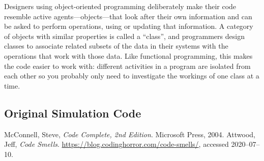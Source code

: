 \documentclass[a4paper]{article}
\begin{document}
Designers using object-oriented programming deliberately make their code resemble active agents---objects---that look after their own information and can be asked to perform operations, using or updating that information.
A category of objects with similar properties is called a ``class'', and programmers design classes to associate related subsets of the data in their systems with the operations that work with those data.
Like functional programming, this makes the code easier to work with: different activities in a program are isolated from each other so you probably only need to investigate the workings of one class at a time.

\begin{appendices}
\section{Original Simulation Code\label{code-appendix}}



\end{appendices}

\begin{thebibliography}{9}
   McConnell, Steve, \textit{Code Complete, 2nd Edition}. Microsoft Press, 2004.
   Attwood, Jeff, \textit{Code Smells}. \url{https://blog.codinghorror.com/code-smells/}, accessed 2020--07--10.
\end{thebibliography}
\end{document}
